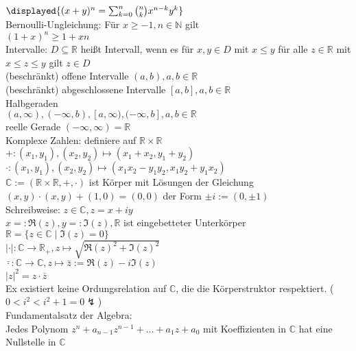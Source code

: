\documentclass[9pt, landscape,a4paper]{extarticle}
\newcommand*\abs[1]{\lvert#1\rvert}
\begin{document}
\begin{multicols*}{4}
  $\displayed{(x + y)^n = \sum_{k = 0}^n\binom{n}{k} x^{n - k}y^k}$ \\
  Bernoulli-Ungleichung: Für $x\geq -1, n\in \mathbb{N}$ gilt \\
  $(1 + x)^n \geq 1 + xn$ \\
  Intervalle: $D \subseteq \mathbb{R}$ heißt Intervall, wenn es für $x, y \in D$ mit $x \leq y$ für alle
  $z \in \mathbb{R}$ mit $x\leq z \leq y$ gilt $z\in D$ \\
  (beschränkt) offene Intervalle $(a, b), a, b \in \mathbb{R}$ \\
  (beschränkt) abgeschlossene Intervalle $[a, b], a, b\in\mathbb{R}$ \\
  Halbgeraden \\
  $(a, \infty), (-\infty, b), [a,\infty), (-\infty, b], a, b\in\mathbb{R}$ \\
  reelle Gerade $(-\infty, \infty) = \mathbb{R}$ \\
  Komplexe Zahlen: definiere auf $\mathbb{R} \times \mathbb{R}$ \\
  $+: (x_1, y_1), (x_2, y_2)\mapsto (x_1 + x_2, y_1 + y_2)$ \\
  $\cdot: (x_1, y_1), (x_2, y_2)\mapsto (x_1x_2  - y_1 y_2, x_1 y_2 + y_1 x_2)$ \\
  $\mathbb{C} := (\mathbb{R}\times\mathbb{R}, +, \cdot)$ ist Körper mit Lösungen der Gleichung \\
  $(x, y) \cdot (x, y) + (1,0) = (0,0)$ der Form $\pm i:= (0, \pm 1)$ \\
  Schreibweise: $z\in\mathbb{C}, z = x + i y$ \\
  $x =: \Re(z), y =: \Im(z), \mathbb{R}$ ist eingebetteter Unterkörper \\
  $\mathbb{R} = \{z \in \mathbb{C} \mid \Im(z) = 0\}$ \\
  $\abs{\cdot}: \mathbb{C} \to \mathbb{R}_{+}, z\mapsto \sqrt{\Re(z)^2 + \Im(z)^2}$ \\
  $\bar\cdot: \mathbb{C}\to\mathbb{C}, z\mapsto \bar z := \Re(z) - i\Im(z)$ \\
  $\abs{z}^2 = z\cdot\bar z$ \\
  Ex existiert keine Ordungsrelation auf $\mathbb{C}$, die die Körperstruktor respektiert. ($0 < i^2 < i^2 + 1 = 0 \lightning$) \\
  Fundamentalsatz der Algebra: \\
  Jedes Polynom $z^n + a_{n - 1}z^{n - 1} + \dots + a_1 z + a_0$ mit Koeffizienten in $\mathbb{C}$ hat eine Nullstelle in $\mathbb{C}$

\end{multicols*}
\end{document}
